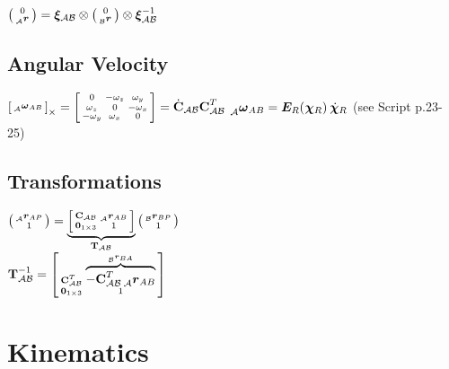 \documentclass[a4paper, 8pt]{extarticle}
\newcommand{\mvec}[3]{  \prescript{}{\mathcal{#1}}{\bm{#2}}  _{#3} }
\newcommand{\mdvec}[3]{ \prescript{}{\mathcal{#1}}{\dot{\bm #2}} _{#3} }
\newcommand{\mrot}[2]{ \textbf{#1}_{ \mathcal{#2} } }
\newcommand{\mquat}[1]{ \bm{\xi}_{ \mathcal{#1} } }
\begin{document}
\begin{multicols*}{3}
$\left(\begin{smallmatrix} 0 \\ \mvec{A}{r}{}\end{smallmatrix}\right) = 
\mquat{AB} \otimes
\left(\begin{smallmatrix} 0 \\ \mvec{B}{r}{}\end{smallmatrix}\right)
\otimes \mquat{AB}^{-1}$


\subsection{Angular Velocity}
$\left[ \begin{smallmatrix}\mvec{A}{\omega}{AB}\end{smallmatrix} \right]_{\times} = \left[\begin{smallmatrix}
 0  & -\omega_z  &  \omega_y \\
 \omega_z  &  0  & -\omega_x \\
-\omega_y  &  \omega_x  &  0
\end{smallmatrix}\right] = \dot{\textbf C}_\mathcal{AB}\mrot{C}{AB}^T$
$\mvec{A}{\omega}{AB} = \bm{E}_R(\mvec{}{\chi}{R})\mdvec{}{\chi}{R}$ (see Script p.23-25)


\subsection{Transformations}
$\left(\begin{smallmatrix} \mvec{A}{r}{AP} \\ 1\end{smallmatrix}\right) = 
\underbrace{\left[\begin{smallmatrix}
\mrot{C}{AB}  &  \mvec{A}{r}{AB} \\
\bm{0}_{1\times 3}  &  1 \end{smallmatrix}\right]}_{\mrot{T}{AB}}
\left(\begin{smallmatrix} \mvec{B}{r}{BP} \\ 1\end{smallmatrix}\right)$\\
$\mrot{T}{AB}^{-1} = \left[\begin{smallmatrix}
\mrot{C}{AB}^T  &  \overbrace{-\mrot{C}{AB}^T\mvec{A}{r}{AB}}^{\mvec{B}{r}{BA}} \\
\bm{0}_{1\times 3}  &  1 
\end{smallmatrix}\right]$



\section{Kinematics}

\end{multicols*}
\end{document}
